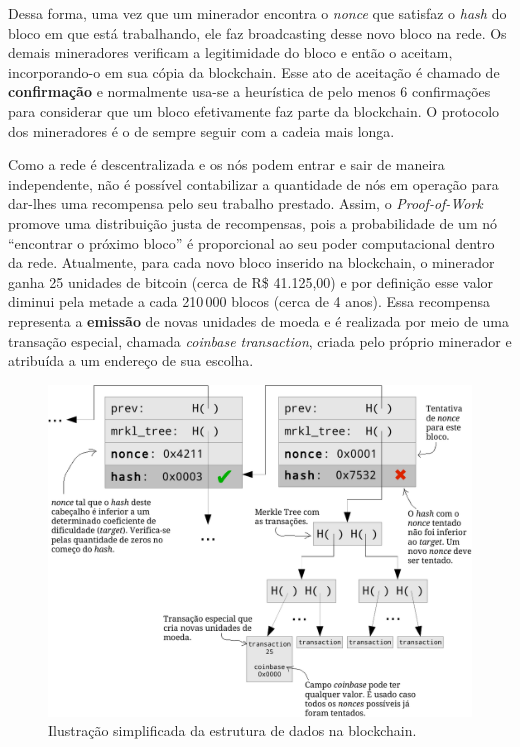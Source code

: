 Dessa forma, uma vez que um minerador encontra o \textit{nonce} que satisfaz o \textit{hash} do bloco em que está trabalhando, ele faz broadcasting desse novo bloco na rede. Os demais mineradores verificam a legitimidade do bloco e então o aceitam, incorporando-o em sua cópia da blockchain. Esse ato de aceitação é chamado de \textbf{confirmação} e normalmente usa-se a heurística de pelo menos 6 confirmações para considerar que um bloco efetivamente faz parte da blockchain. O protocolo dos mineradores é o de sempre seguir com a cadeia mais longa.

Como a rede é descentralizada e os nós podem entrar e sair de maneira independente, não é possível contabilizar a quantidade de nós em operação para dar-lhes uma recompensa pelo seu trabalho prestado. Assim, o \textit{Proof-of-Work} promove uma distribuição justa de recompensas, pois a probabilidade de um nó ``encontrar o próximo bloco'' é proporcional ao seu poder computacional dentro da rede. Atualmente, para cada novo bloco inserido na blockchain, o minerador ganha 25 unidades de bitcoin (cerca de R\$ 41.125,00) e por definição esse valor diminui pela metade a cada 210\,000 blocos (cerca de 4 anos). Essa recompensa representa a \textbf{emissão} de novas unidades de moeda e é realizada por meio de uma transação especial, chamada \textit{coinbase transaction}, criada pelo próprio minerador e atribuída a um endereço de sua escolha.

\begin{figure}[h!]
	\centering
	\includegraphics[scale=0.85]{./images/blockchain.pdf}
	\caption[Ilustração simplificada da estrutura de dados na blockchain.]{Ilustração simplificada da estrutura de dados na blockchain\protect\footnotemark. \label{fig:blockchain}}
\end{figure}

